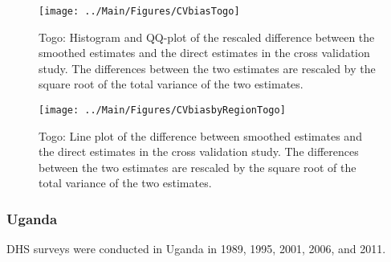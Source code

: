 \documentclass[12pt]{article}\usepackage[]{graphicx}\usepackage[]{color}
\newenvironment{knitrout}{}{} %
\begin{document}
\begin{knitrout}
\color{fgcolor}\begin{figure}[bht]

{\centering \texttt{[image: ../Main/Figures/CVbiasTogo]} 

}

\caption[Togo]{Togo: Histogram and QQ-plot of the rescaled difference between the smoothed estimates and the direct estimates in the cross validation study. The differences between the two estimates are rescaled by the square root of the total variance of the two estimates.}\label{fig:unnamed-chunk-319}
\end{figure}


\end{knitrout}

\begin{knitrout}
\color{fgcolor}\begin{figure}[bht]

{\centering \texttt{[image: ../Main/Figures/CVbiasbyRegionTogo]} 

}

\caption[Togo]{Togo: Line plot of the difference between smoothed estimates and the direct estimates in the cross validation study. The differences between the two estimates are rescaled by the square root of the total variance of the two estimates.}\label{fig:unnamed-chunk-320}
\end{figure}


\end{knitrout}


\clearpage
\subsubsection{Uganda}





DHS surveys were conducted in Uganda in 1989, 1995, 2001, 2006, and 2011.
\end{document}
